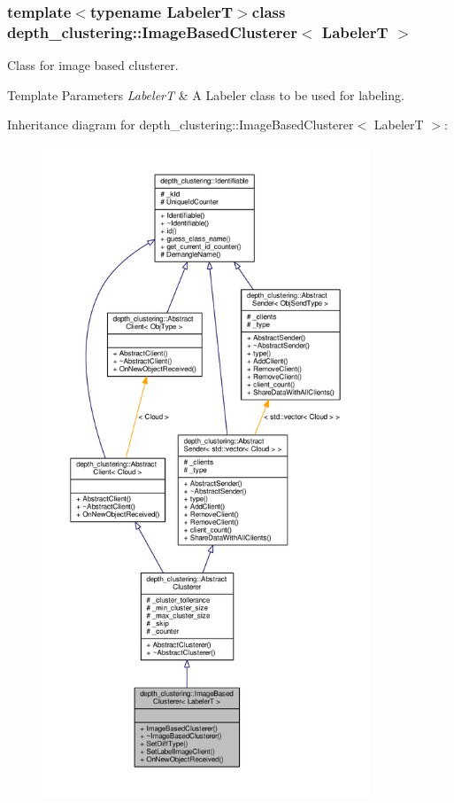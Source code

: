 \subsubsection*{template$<$typename Labeler\-T$>$class depth\-\_\-clustering\-::\-Image\-Based\-Clusterer$<$ Labeler\-T $>$}

Class for image based clusterer. 


\begin{DoxyTemplParams}{Template Parameters}
{\em Labeler\-T} & A Labeler class to be used for labeling. \\
\hline
\end{DoxyTemplParams}


Inheritance diagram for depth\-\_\-clustering\-:\-:Image\-Based\-Clusterer$<$ Labeler\-T $>$\-:
\nopagebreak
\begin{figure}[H]
\begin{center}
\leavevmode
\includegraphics[height=550pt]{classdepth__clustering_1_1ImageBasedClusterer__inherit__graph}
\end{center}
\end{figure}


